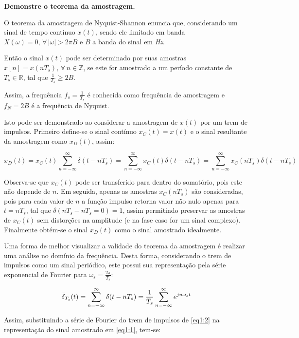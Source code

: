 \textbf{Demonstre o teorema da amostragem.}

\begin{mdframed}
O teorema da amostragem de Nyquist-Shannon enuncia que, considerando um sinal de tempo contínuo $x(t)$, sendo ele limitado em banda $X(\omega)=0, \, \forall \, |\omega|>2\pi B$ e $B$ a banda do sinal em \textit{Hz}.

Então o sinal $x(t)$ pode ser determinado por suas amostras $x[n]=x(nT_s), \, \forall \, n \in \mathbb{Z}$, se este for amostrado a um período constante de $T_s \in \mathbb{R}$, tal que $\frac{1}{T_s} \geq 2B$.

Assim, a frequência $f_s = \frac{1}{T_s}$ é conhecida como frequência de amostragem e $f_N = 2B$ é a frequência de Nyquist.
\end{mdframed}

Isto pode ser demonstrado ao considerar a amostragem de $x(t)$ por um trem de impulsos. Primeiro define-se o sinal contínuo $x_C(t) = x(t)$ e o sinal resultante da amostragem como $x_D(t)$, assim:

\begin{equation} \label{eq1:1}
    x_D(t) = x_C(t) \sum_{n=-\infty}^{\infty} \delta(t-nT_s) =  \sum_{n=-\infty}^{\infty} x_C(t) \delta(t-nT_s) = \sum_{n=-\infty}^{\infty} x_C(nT_s) \delta(t-nT_s)
\end{equation}

Observa-se que $x_C(t)$ pode ser transferido para dentro do somatório, pois este não depende de $n$. Em seguida, apenas as amostras $x_C(nT_s)$ são consideradas, pois para cada valor de $n$ a função impulso retorna valor não nulo apenas para $t=nT_s$, tal que $\delta(nT_s-nT_s=0) = 1$, assim permitindo preservar as amostras de $x_C(t)$ sem distorções na amplitude (e na fase caso for um sinal complexo). Finalmente obtém-se o sinal $x_D(t)$ como o sinal amostrado idealmente.

Uma forma de melhor visualizar a validade do teorema da amostragem é realizar uma análise no domínio da frequência. Desta forma, considerando o trem de impulsos como um sinal periódico, este possui sua representação pela série exponencial de Fourier para $\omega_s = \frac{2\pi}{T_s}$:

\begin{equation} \label{eq1:2}
    \Bar{\delta}_{T_s}(t) = \sum_{n=-\infty}^{\infty} \delta(t-nT_s) = \frac{1}{T_s} \sum_{n=-\infty}^{\infty} e^{jn\omega_s t}
\end{equation}

Assim, substituindo a série de Fourier do trem de impulsos de \ref{eq1:2} na representação do sinal amostrado em \ref{eq1:1}, tem-se:

